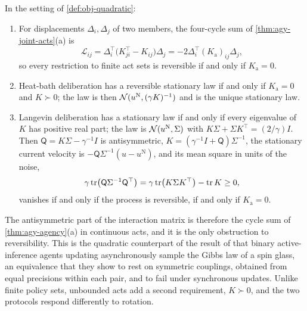 \begin{theorem}\label{thm:obj-rotation}
In the setting of \cref{def:obj-quadratic}:
\begin{enumerate}
\item[(a)] For displacements $\Delta_i,\Delta_j$ of two members, the four-cycle sum of \cref{thm:agy-joint-acts}(a) is
\begin{equation}\label{eq:obj-cycle}
\mathcal L_{ij}=\Delta_i^\top\bigl(K_{ji}^\top-K_{ij}\bigr)\Delta_j=-2\Delta_i^\top(K_{\mathrm a})_{ij}\Delta_j,
\end{equation}
so every restriction to finite act sets is reversible if and only if $K_{\mathrm a}=0$.
\item[(b)] Heat-bath deliberation has a reversible stationary law if and only if $K_{\mathrm a}=0$ and $K\succ0$; the law is then $\mathcal{N}(u^{\mathrm N},(\gamma K)^{-1})$ and is the unique stationary law.
\item[(c)] Langevin deliberation has a stationary law if and only if every eigenvalue of $K$ has positive real part; the law is $\mathcal{N}(u^{\mathrm N},\Sigma)$ with $K\Sigma+\Sigma K^\top=(2/\gamma)I$. Then $\mathsf Q=K\Sigma-\gamma^{-1}I$ is antisymmetric, $K=(\gamma^{-1}I+\mathsf Q)\Sigma^{-1}$, the stationary current velocity is $-\mathsf Q\Sigma^{-1}(u-u^{\mathrm N})$, and its mean square in units of the noise,
\begin{equation}\label{eq:obj-entropy}
\gamma\operatorname{tr}\bigl(\mathsf Q\Sigma^{-1}\mathsf Q^\top\bigr)=\gamma\operatorname{tr}\bigl(K\Sigma K^\top\bigr)-\operatorname{tr} K\ge0,
\end{equation}
vanishes if and only if the process is reversible, if and only if $K_{\mathrm a}=0$.
\end{enumerate}
\end{theorem}

The antisymmetric part of the interaction matrix is therefore the cycle sum of \cref{thm:agy-agency}(a) in continuous acts, and it is the only obstruction to reversibility. This is the quadratic counterpart of the result of \citet{heins2023spin} that binary active-inference agents updating asynchronously sample the Gibbs law of a spin glass, an equivalence that they show to rest on symmetric couplings, obtained from equal precisions within each pair, and to fail under synchronous updates. Unlike finite policy sets, unbounded acts add a second requirement, $K\succ0$, and the two protocols respond differently to rotation.

